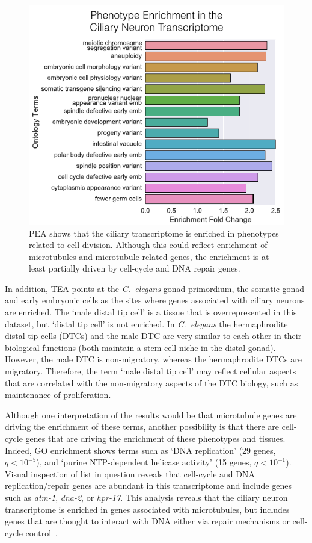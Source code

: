 \documentclass[10pt, onecolumn]{article}
\newcommand{\cel}{\emph{C.~elegans}}
\newcommand{\qval}[1]{\ensuremath{q<10^{-#1}}}
\begin{document}
\begin{figure}[htbp]
  \renewcommand{\familydefault}{\sfdefault}\normalfont{}
  \centering
  \includegraphics[width=.5\linewidth]{ciliary-transcriptome.pdf}
  \caption{PEA shows that the ciliary transcriptome is enriched in phenotypes
  related to cell division. Although this could reflect enrichment of
  microtubules and microtubule-related genes, the enrichment is at least
  partially driven by cell-cycle and DNA repair genes.}
\label{fig:cilia}
\end{figure}


In addition, TEA points at the \cel{} gonad primordium, the somatic gonad and
early embryonic cells as the sites where genes associated with ciliary neurons
are enriched. The `male distal tip cell' is a tissue that is overrepresented in
this dataset, but `distal tip cell' is not enriched. In \cel{} the hermaphrodite
distal tip cells (DTCs) and the male DTC are very similar to each other in their
biological functions (both maintain a stem cell niche in the distal gonad).
However, the male DTC is non-migratory, whereas the hermaphrodite DTCs are
migratory. Therefore, the term `male distal tip cell' may reflect cellular
aspects that are correlated with the non-migratory aspects of the DTC biology,
such as maintenance of proliferation.

Although one interpretation of the results would be that microtubule genes are
driving the enrichment of these terms, another possibility is that there are
cell-cycle genes that are driving the enrichment of these phenotypes and
tissues. Indeed, GO enrichment shows terms such as `DNA replication' (29 genes,
\qval{5}), and `purine NTP-dependent helicase activity' (15 genes, \qval{1}).
Visual inspection of list in question reveals that cell-cycle and DNA
replication/repair genes are abundant in this transcriptome and include genes
such as \emph{atm-1}, \emph{dna-2}, or \emph{hpr-17}. This analysis reveals that
the ciliary neuron transcriptome is enriched in genes associated with
microtubules, but includes genes that are thought to interact with DNA either
via repair mechanisms or cell-cycle
control~\cite{Hofmann2000,Lee2003a,Bailly2010}.
\end{document}
